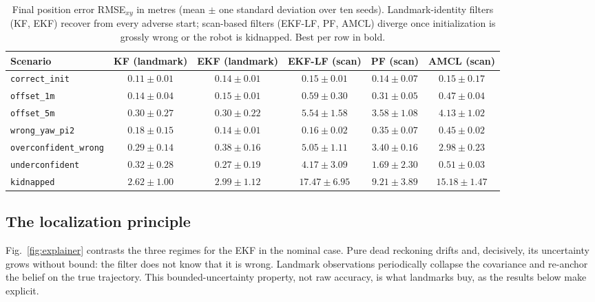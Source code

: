 \documentclass[conference]{IEEEtran}
\begin{document}
\begin{table}[!t]
\centering
\setlength{\tabcolsep}{0.5em}
{\renewcommand{\arraystretch}{1.25}
\begin{tabular}{|l|c|c|c|c|c|}
\hline
\textbf{Scenario} & \textbf{KF (landmark)} & \textbf{EKF (landmark)} & \textbf{EKF-LF (scan)} & \textbf{PF (scan)} & \textbf{AMCL (scan)} \\ \hline
\texttt{correct\_init}        & $0.11\pm0.01$ & $0.14\pm0.01$ & $0.15\pm0.01$ & $0.14\pm0.07$ & $0.15\pm0.17$ \\ \hline
\texttt{offset\_1m}           & $0.14\pm0.04$ & $0.15\pm0.01$ & $0.59\pm0.30$ & $0.31\pm0.05$ & $0.47\pm0.04$ \\ \hline
\texttt{offset\_5m}           & $\mathbf{0.30\pm0.27}$ & $0.30\pm0.22$ & $5.54\pm1.58$ & $3.58\pm1.08$ & $4.13\pm1.02$ \\ \hline
\texttt{wrong\_yaw\_pi2}      & $0.18\pm0.15$ & $\mathbf{0.14\pm0.01}$ & $0.16\pm0.02$ & $0.35\pm0.07$ & $0.45\pm0.02$ \\ \hline
\texttt{overconfident\_wrong} & $\mathbf{0.29\pm0.14}$ & $0.38\pm0.16$ & $5.05\pm1.11$ & $3.40\pm0.16$ & $2.98\pm0.23$ \\ \hline
\texttt{underconfident}       & $0.32\pm0.28$ & $\mathbf{0.27\pm0.19}$ & $4.17\pm3.09$ & $1.69\pm2.30$ & $0.51\pm0.03$ \\ \hline
\texttt{kidnapped}            & $\mathbf{2.62\pm1.00}$ & $2.99\pm1.12$ & $17.47\pm6.95$ & $9.21\pm3.89$ & $15.18\pm1.47$ \\ \hline
\end{tabular}}
\caption{Final position error RMSE$_{xy}$ in metres (mean $\pm$ one standard deviation over ten seeds). Landmark-identity filters (KF, EKF) recover from every adverse start; scan-based filters (EKF-LF, PF, AMCL) diverge once initialization is grossly wrong or the robot is kidnapped. Best per row in bold.}
\label{tab:rmse}
\end{table}

\subsection{The localization principle}
Fig.~\ref{fig:explainer} contrasts the three regimes for the EKF in the nominal case. Pure dead reckoning drifts and, decisively, its uncertainty grows without bound: the filter does not know that it is wrong. Landmark observations periodically collapse the covariance and re-anchor the belief on the true trajectory. This bounded-uncertainty property, not raw accuracy, is what landmarks buy, as the results below make explicit.
\end{document}
